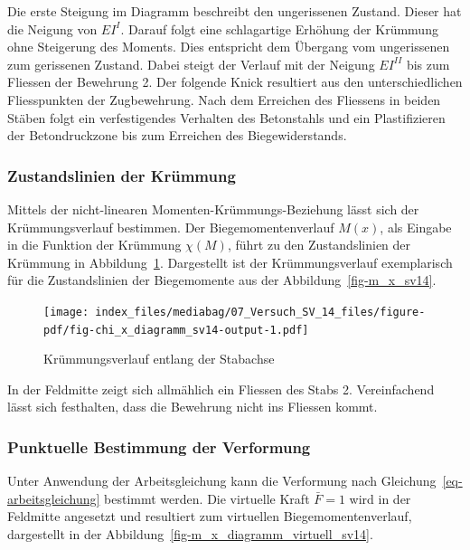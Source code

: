 \documentclass[
  12pt,
  letterpaper,
  egregdoesnotlikesansseriftitles]{scrreprt}
\begin{document}
Die erste Steigung im Diagramm beschreibt den ungerissenen Zustand.
Dieser hat die Neigung von \(EI^I\). Darauf folgt eine schlagartige
Erhöhung der Krümmung ohne Steigerung des Moments. Dies entspricht dem
Übergang vom ungerissenen zum gerissenen Zustand. Dabei steigt der
Verlauf mit der Neigung \(EI^{II}\) bis zum Fliessen der Bewehrung 2.
Der folgende Knick resultiert aus den unterschiedlichen Fliesspunkten
der Zugbewehrung. Nach dem Erreichen des Fliessens in beiden Stäben
folgt ein verfestigendes Verhalten des Betonstahls und ein
Plastifizieren der Betondruckzone bis zum Erreichen des
Biegewiderstands.

\hypertarget{zustandslinien-der-kruxfcmmung-1}{%
\subsubsection{Zustandslinien der
Krümmung}\label{zustandslinien-der-kruxfcmmung-1}}

Mittels der nicht-linearen Momenten-Krümmungs-Beziehung lässt sich der
Krümmungsverlauf bestimmen. Der Biegemomentenverlauf \(M(x)\), als
Eingabe in die Funktion der Krümmung \(\chi(M)\), führt zu den
Zustandslinien der Krümmung in Abbildung~\ref{fig-chi_x_diagramm_sv14}.
Dargestellt ist der Krümmungsverlauf exemplarisch für die Zustandslinien
der Biegemomente aus der Abbildung~\ref{fig-m_x_sv14}.

\begin{figure}[H]

{\centering \texttt{[image: index\_files/mediabag/07\_Versuch\_SV\_14\_files/figure-pdf/fig-chi\_x\_diagramm\_sv14-output-1.pdf]}

}

\caption{\label{fig-chi_x_diagramm_sv14}Krümmungsverlauf entlang der
Stabachse}

\end{figure}

In der Feldmitte zeigt sich allmählich ein Fliessen des Stabs 2.
Vereinfachend lässt sich festhalten, dass die Bewehrung nicht ins
Fliessen kommt.

\hypertarget{punktuelle-bestimmung-der-verformung-1}{%
\subsubsection{Punktuelle Bestimmung der
Verformung}\label{punktuelle-bestimmung-der-verformung-1}}

Unter Anwendung der Arbeitsgleichung kann die Verformung nach
Gleichung~\ref{eq-arbeitsgleichung} bestimmt werden. Die virtuelle Kraft
\(\bar{F} = 1\) wird in der Feldmitte angesetzt und resultiert zum
virtuellen Biegemomentenverlauf, dargestellt in der
Abbildung~\ref{fig-m_x_diagramm_virtuell_sv14}.
\end{document}
